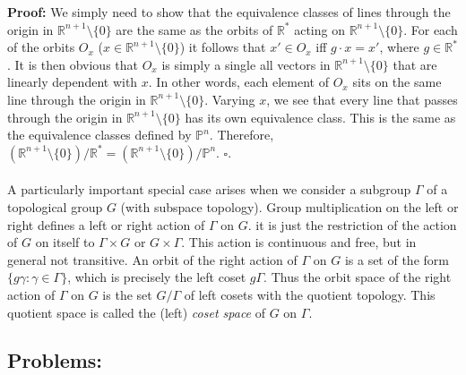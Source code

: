 \documentclass{article}
\begin{document}
  \textbf{Proof: } We simply need to show that the equivalence classes of lines through the origin in \(\mathbb{R}^{n+1}\setminus\{0\}\) are the same as the orbits of \(\mathbb{R}^*\) acting on \(\mathbb{R}^{n+1}\setminus\{0\}\). For each of the orbits \(O_x\) (\(x\in \mathbb{R}^{n+1}\setminus \{0\}\)) it follows that \(x'\in O_x\) iff \(g \cdot x=x'\), where \(g\in \mathbb{R}^*\). It is then obvious that \(O_x\) is simply a single all vectors in \(\mathbb{R}^{n+1}\setminus\{0\}\) that are linearly dependent with \(x\). In other words, each element of \(O_x\) sits on the same line through the origin in \(\mathbb{R}^{n+1}\setminus\{0\}\). Varying \(x\), we see that every line that passes through the origin in \(\mathbb{R}^{n+1}\setminus\{0\}\) has its own equivalence class. This is the same as the equivalence classes defined by \(\mathbb{P}^n\). Therefore, \((\mathbb{R}^{n+1}\setminus\{0\})/\mathbb{R}^*=(\mathbb{R}^{n+1}\setminus\{0\})/\mathbb{P}^n\). \(\square\).\\
  \\
  A particularly important special case arises when we consider a subgroup \(\Gamma\) of a topological group \(G\) (with subspace topology). Group multiplication on the left or right defines a left or right action of \(\Gamma\) on \(G\). it is just the restriction of the action of \(G\) on itself to \(\Gamma\times G\) or \(G\times \Gamma\). This action is continuous and free, but in general not transitive. An orbit of the right action of \(\Gamma\) on \(G\) is a set of the form \(\{g\gamma:\gamma\in\Gamma\}\), which is precisely the left coset \(g\Gamma\). Thus the orbit space of the right action of \(\Gamma\) on \(G\) is the set \(G/\Gamma \) of left cosets with the quotient topology. This quotient space is called the (left) \textit{coset space} of \(G\) on \(\Gamma\).

  \subsection{Problems:}
\end{document}
